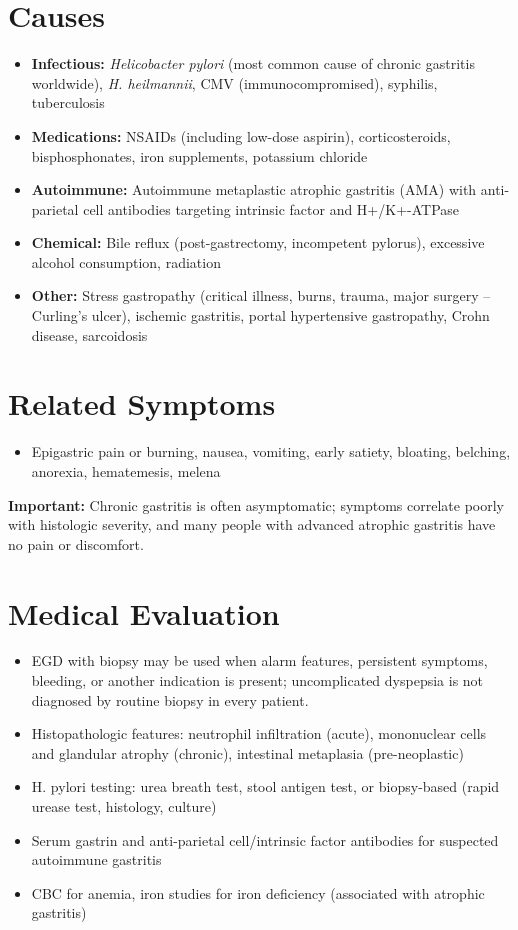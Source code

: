 \section*{Causes}
\begin{itemize}
  \item \textbf{Infectious:} \textit{Helicobacter pylori} (most common cause of chronic gastritis worldwide), \textit{H. heilmannii}, CMV (immunocompromised), syphilis, tuberculosis
  \item \textbf{Medications:} NSAIDs (including low-dose aspirin), corticosteroids, bisphosphonates, iron supplements, potassium chloride
  \item \textbf{Autoimmune:} Autoimmune metaplastic atrophic gastritis (AMA) with anti-parietal cell antibodies targeting intrinsic factor and H+/K+-ATPase
  \item \textbf{Chemical:} Bile reflux (post-gastrectomy, incompetent pylorus), excessive alcohol consumption, radiation
  \item \textbf{Other:} Stress gastropathy (critical illness, burns, trauma, major surgery -- Curling's ulcer), ischemic gastritis, portal hypertensive gastropathy, Crohn disease, sarcoidosis
\end{itemize}

\section*{Related Symptoms}
\begin{itemize}
  \item Epigastric pain or burning, nausea, vomiting, early satiety, bloating, belching, anorexia, hematemesis, melena
\end{itemize}
\textbf{Important:} Chronic gastritis is often asymptomatic; symptoms correlate poorly with histologic severity, and many people with advanced atrophic gastritis have no pain or discomfort.

\section*{Medical Evaluation}
\begin{itemize}
  \item EGD with biopsy may be used when alarm features, persistent symptoms, bleeding, or another indication is present; uncomplicated dyspepsia is not diagnosed by routine biopsy in every patient.
  \item Histopathologic features: neutrophil infiltration (acute), mononuclear cells and glandular atrophy (chronic), intestinal metaplasia (pre-neoplastic)
  \item H. pylori testing: urea breath test, stool antigen test, or biopsy-based (rapid urease test, histology, culture)
  \item Serum gastrin and anti-parietal cell/intrinsic factor antibodies for suspected autoimmune gastritis
  \item CBC for anemia, iron studies for iron deficiency (associated with atrophic gastritis)
\end{itemize}

